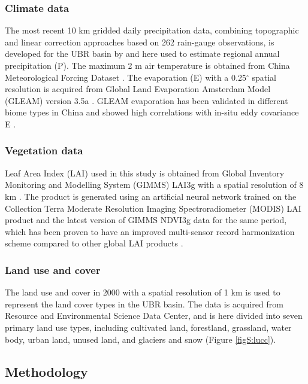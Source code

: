 \documentclass[hess, manuscript]{copernicus}
\begin{document}
\subsubsection{Climate data}
The most recent 10 km gridded daily precipitation data, combining topographic and linear correction approaches based on 262 rain-gauge observations, is developed for the UBR basin by \citet{sun2020precipitation} and here used to estimate regional annual precipitation (P). The maximum 2 m air temperature is obtained from China Meteorological Forcing Dataset \citep{he2020first}. The evaporation (E) with a 0.25$^{\circ}$ spatial resolution is acquired from Global Land Evaporation Amsterdam Model (GLEAM) version 3.5a \citep{martens2017gleam}. GLEAM evaporation has been validated in different biome types in China and showed high correlations with in-situ eddy covariance E \citep{yang2017multi}.

\subsubsection{Vegetation data}
Leaf Area Index (LAI) used in this study is obtained from Global Inventory Monitoring and Modelling System (GIMMS) LAI3g with a spatial resolution of 8 km \citep{zhu2013global}. The product is generated using an artificial neural network trained on the Collection Terra Moderate Resolution Imaging Spectroradiometer (MODIS) LAI product and the latest version of GIMMS NDVI3g data for the same period, which has been proven to have an improved multi-sensor record harmonization scheme compared to other global LAI products \citep{forzieri2020increased,gonsamo2021greening,zhu2016greening}. 

\subsubsection{Land use and cover}
The land use and cover in 2000 with a spatial resolution of 1 km is used to represent the land cover types in the UBR basin. The data is acquired from Resource and Environmental Science Data Center, and is here divided into seven primary land use types, including cultivated land, forestland, grassland, water body, urban land, unused land, and glaciers and snow (Figure \ref{figS:lucc}).

\subsection{Methodology}
\end{document}

